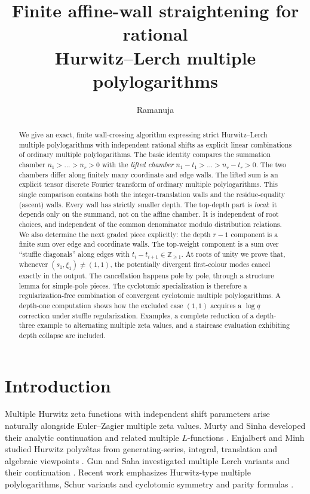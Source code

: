 \documentclass[11pt]{amsart}
\title[Affine-wall straightening for Hurwitz--Lerch MPLs]{Finite affine-wall straightening for rational\\ Hurwitz--Lerch multiple polylogarithms}
\author{Ramanuja}
\theoremstyle{definition}
\theoremstyle{remark}
\numberwithin{equation}{section}
\newcommand{\Z}{\mathbb{Z}}
\begin{document}
\begin{abstract}
We give an exact, finite wall-crossing algorithm expressing strict Hurwitz--Lerch multiple polylogarithms with independent rational shifts as explicit linear combinations of ordinary multiple polylogarithms. The basic identity compares the summation chamber $n_1>\dots>n_r>0$ with the \emph{lifted chamber} $n_1-t_1>\dots>n_r-t_r>0$. The two chambers differ along finitely many coordinate and edge walls. The lifted sum is an explicit tensor discrete Fourier transform of ordinary multiple polylogarithms. This single comparison contains both the integer-translation walls and the residue-equality (ascent) walls. Every wall has strictly smaller depth.
The top-depth part is \emph{local}: it depends only on the summand, not on the affine chamber. It is independent of root choices, and independent of the common denominator modulo distribution relations. We also determine the next graded piece explicitly: the depth $r-1$ component is a finite sum over edge and coordinate walls. The top-weight component is a sum over ``stuffle diagonals'' along edges with $t_i-t_{i+1}\in\Z_{\ge1}$.
At roots of unity we prove that, whenever $(s_1,\xi_1)\neq(1,1)$, the potentially divergent first-colour modes cancel exactly in the output. The cancellation happens pole by pole, through a structure lemma for simple-pole pieces. The cyclotomic specialization is therefore a regularization-free combination of convergent cyclotomic multiple polylogarithms. A depth-one computation shows how the excluded case $(1,1)$ acquires a $\log q$ correction under stuffle regularization. Examples, a complete reduction of a depth-three example to alternating multiple zeta values, and a staircase evaluation exhibiting depth collapse are included.
\end{abstract}

\maketitle

\section{Introduction}

Multiple Hurwitz zeta functions with independent shift parameters arise naturally alongside Euler--Zagier multiple zeta values. Murty and Sinha developed their analytic continuation and related multiple $L$-functions \cite{MS06}. Enjalbert and Minh studied Hurwitz polyz\^etas from generating-series, integral, translation and algebraic viewpoints \cite{EM07,EM12}. Gun and Saha investigated multiple Lerch variants and their continuation \cite{GS18}. Recent work emphasizes Hurwitz-type multiple polylogarithms, Schur variants and cyclotomic symmetry and parity formulas \cite{Iha+24,MN25,Xu26,Rui25,LX26}.
\end{document}
